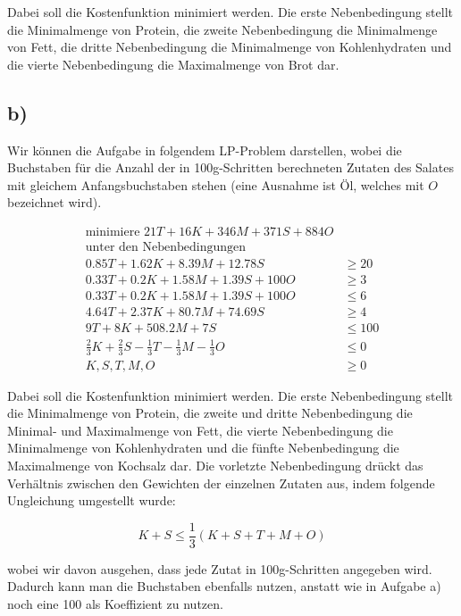 \documentclass{article}
\begin{document}
Dabei soll die Kostenfunktion minimiert werden. Die erste Nebenbedingung stellt die Minimalmenge von Protein, die zweite Nebenbedingung die Minimalmenge von Fett, die dritte Nebenbedingung die Minimalmenge von Kohlenhydraten und die vierte Nebenbedingung die Maximalmenge von Brot dar.


\subsection*{b)}
Wir können die Aufgabe in folgendem LP-Problem darstellen, wobei die Buchstaben für die Anzahl der in 100g-Schritten berechneten Zutaten des Salates mit gleichem Anfangsbuchstaben stehen (eine Ausnahme ist Öl, welches mit $O$ bezeichnet wird).

\begin{align*}
	\text{minimiere } 21T + 16K + 346M + 371S + 884O\\
	\text{unter den Nebenbedingungen}\\
	0.85T + 1.62K + 8.39M + 12.78S &\geq 20\\
	0.33T + 0.2K + 1.58M + 1.39S + 100O &\geq 3\\
	0.33T + 0.2K + 1.58M + 1.39S + 100O &\leq 6\\
	4.64T + 2.37K + 80.7M + 74.69S &\geq 4\\
	9T + 8K + 508.2M + 7S &\leq 100\\
	\frac{2}{3}K + \frac{2}{3}S - \frac{1}{3}T - \frac{1}{3}M - \frac{1}{3}O &\leq 0\\
	K, S, T, M, O &\geq 0
\end{align*}

Dabei soll die Kostenfunktion minimiert werden. Die erste Nebenbedingung stellt die Minimalmenge von Protein, die zweite und dritte Nebenbedingung die Minimal- und Maximalmenge von Fett, die vierte Nebenbedingung die Minimalmenge von Kohlenhydraten und die fünfte Nebenbedingung die Maximalmenge von Kochsalz dar. Die vorletzte Nebenbedingung drückt das Verhältnis zwischen den Gewichten der einzelnen Zutaten aus, indem folgende Ungleichung umgestellt wurde:

$$K + S \leq \frac{1}{3}(K + S + T + M + O)$$

wobei wir davon ausgehen, dass jede Zutat in 100g-Schritten angegeben wird. Dadurch kann man die Buchstaben ebenfalls nutzen, anstatt wie in Aufgabe a) noch eine 100 als Koeffizient zu nutzen.
\end{document}
